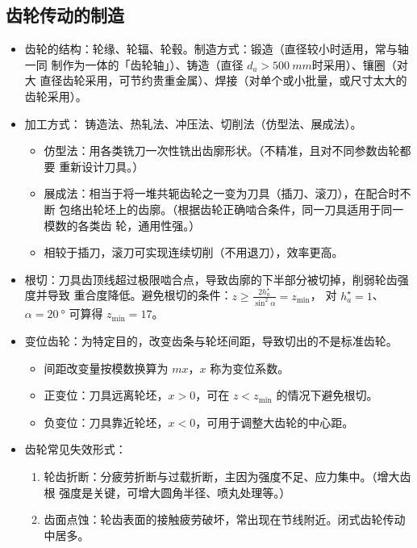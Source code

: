 \documentclass[12pt,a4paper]{article}
\newcommand{\tightlist}{\setlength{\parskip}{0pt}\setlength{\itemsep}{0pt}}
\newcommand{\hint}[1]{\textsf{（#1）}}
\newcommand{\minor}[1]{{\color{gray} #1}}
\begin{document}
\subsection{齿轮传动的制造}
\begin{itemize}\tightlist
    \item 齿轮的结构：轮缘、轮辐、轮毂。制造方式：锻造\hint{直径较小时适用，常与轴一同
    制作为一体的「齿轮轴」}、铸造\hint{直径 $d_a>\SI{500}{mm}$时采用}、镶圈\hint{对大
    直径齿轮采用，可节约贵重金属}、焊接\hint{对单个或小批量，或尺寸太大的齿轮采用}。
    \item 加工方式：\minor{铸造法、热轧法、冲压法、}切削法\hint{仿型法、展成法}。
    \begin{itemize}\tightlist
        \item 仿型法：用各类铣刀一次性铣出齿廓形状。\hint{不精准，且对不同参数齿轮都要
        重新设计刀具。}
        \item 展成法：相当于将一堆共轭齿轮之一变为刀具\hint{插刀、滚刀}，在配合时不断
        包络出轮坯上的齿廓。\hint{根据齿轮正确啮合条件，同一刀具适用于同一模数的各类齿
        轮，通用性强。}
        \item 相较于插刀，滚刀可实现连续切削\hint{不用退刀}，效率更高。
    \end{itemize}
    \item 根切：刀具齿顶线超过极限啮合点，导致齿廓的下半部分被切掉，削弱轮齿强度并导致
    重合度降低。避免根切的条件：$z\geq\frac{2h_a^\star}{\sin^2\alpha}=z_\text{min}$，
    对 $h_a^\star=1$、$\alpha=\SI{20}\degree$ 可算得 $z_\text{min}=17$。
    \item 变位齿轮：为特定目的，改变齿条与轮坯间距，导致切出的不是标准齿轮。
    \begin{itemize}\tightlist
        \item 间距改变量按模数换算为 $mx$，$x$ 称为变位系数。
        \item 正变位：刀具远离轮坯，$x>0$，可在 $z<z_\text{min}$ 的情况下避免根切。
        \item 负变位：刀具靠近轮坯，$x<0$，可用于调整大齿轮的中心距。
    \end{itemize}
    \item 齿轮常见失效形式：
    \begin{enumerate}\tightlist
        \item 轮齿折断：分疲劳折断与过载折断，主因为强度不足、应力集中。\hint{增大齿根
        强度是关键，可增大圆角半径、喷丸处理等。}
        \item 齿面点蚀：轮齿表面的接触疲劳破坏，常出现在节线附近。闭式齿轮传动中居多。

\end{enumerate}
\end{itemize}
\end{document}
